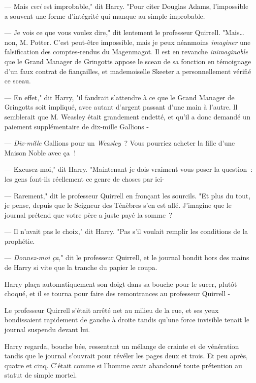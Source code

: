 --- Mais \emph{ceci} est improbable," dit Harry. "Pour citer Douglas Adams, l'impossible a souvent une forme d'intégrité qui manque au simple improbable.

--- Je vois ce que vous voulez dire," dit lentement le professeur Quirrell. "Mais… non, M. Potter. C'est peut-être impossible, mais je peux néanmoins \emph{imaginer} une falsification des comptes-rendus du Magenmagot. Il est en revanche \emph{inimaginable} que le Grand Manager de Gringotts appose le sceau de sa fonction en témoignage d'un faux contrat de fiançailles, et mademoiselle Skeeter a personnellement vérifié ce sceau.

--- En effet," dit Harry, "il faudrait s'attendre à ce que le Grand Manager de Gringotts soit impliqué, avec autant d'argent passant d'une main à l'autre. Il semblerait que M. Weasley était grandement endetté, et qu'il a donc demandé un paiement supplémentaire de dix-mille Gallions -

--- \emph{Dix-mille} Gallions pour un \emph{Weasley}~? Vous pourriez acheter la fille d'une Maison Noble avec ça~!

--- Excusez-moi," dit Harry. "Maintenant je dois vraiment vous poser la question~: les gens font-ils réellement ce genre de choses par ici-

--- Rarement," dit le professeur Quirrell en fronçant les sourcils. "Et plus du tout, je pense, depuis que le Seigneur des Ténèbres s'en est allé. J'imagine que le journal prétend que votre père a juste payé la somme~?

--- Il n'avait pas le choix," dit Harry. "Pas s'il voulait remplir les conditions de la prophétie.

--- \emph{Donnez-moi ça}," dit le professeur Quirrell, et le journal bondit hors des mains de Harry si vite que la tranche du papier le coupa.

Harry plaça automatiquement son doigt dans sa bouche pour le sucer, plutôt choqué, et il se tourna pour faire des remontrances au professeur Quirrell -

Le professeur Quirrell s'était arrêté net au milieu de la rue, et ses yeux bondissaient rapidement de gauche à droite tandis qu'une force invisible tenait le journal suspendu devant lui.

Harry regarda, bouche bée, ressentant un mélange de crainte et de vénération tandis que le journal s'ouvrait pour révéler les pages deux et trois. Et peu après, quatre et cinq. C'était comme si l'homme avait abandonné toute prétention au statut de simple mortel.

